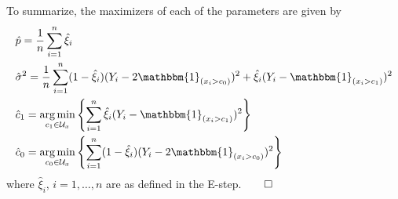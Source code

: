 \documentclass[10pt]{article}
\newcommand{\1}[1]{\mathbbm{1}_{#1}}
\newcommand{\mc}[1]{\mathcal{#1}}
\DeclareMathOperator{\argmin}{arg\,min}
\begin{document}
To summarize, the maximizers of each of the parameters are given by
\begin{align*}
    &\hat{p}=\frac{1}{n}\sum_{i=1}^n\hat{\xi}_i\\
    &\hat{\sigma}^2=\frac{1}{n}\sum_{i=1}^n(1-\hat{\xi}_i)(Y_i-2\mathbbm{1}_{(x_i>c_0)})^2+\hat{\xi}_i(Y_i-\mathbbm{1}_{(x_i>c_1)})^2\\
    &\hat{c}_1=\argmin_{c_1\in\mc{U}_x}\left\{\sum_{i=1}^n\hat{\xi}_i(Y_i-\mathbbm{1}_{(x_i>c_1)})^2\right\}\\
    &\hat{c}_0=\argmin_{c_0\in\mc{U}_x}\left\{\sum_{i=1}^n(1-\hat{\xi}_i)(Y_i-2\mathbbm{1}_{(x_i>c_0)})^2\right\}
\end{align*}
where $\hat{\xi}_i$, $i=1,\dots,n$ are as defined in the E-step.\hfill{$\qed$}
\end{document}
